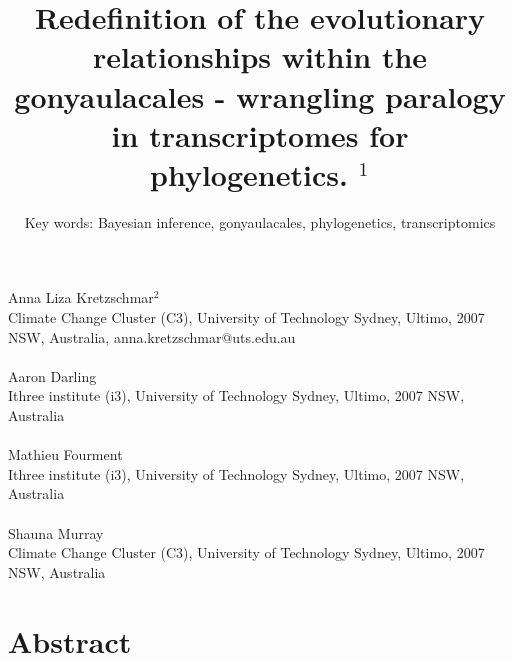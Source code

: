 \documentclass[12pt]{article}
\title{Redefinition of the evolutionary relationships within the gonyaulacales - wrangling paralogy in transcriptomes for phylogenetics. $^{1}$}
\author{Key words: Bayesian inference, gonyaulacales, phylogenetics, transcriptomics}
\date{}
\begin{document}
\maketitle
\paragraph{}Anna Liza Kretzschmar$^{2}$\\
Climate Change Cluster (C3), University of Technology Sydney, Ultimo, 2007 NSW, Australia, anna.kretzschmar@uts.edu.au
\paragraph{}Aaron Darling \\
Ithree institute (i3), University of Technology Sydney, Ultimo, 2007 NSW, Australia
\paragraph{}Mathieu Fourment \\
Ithree institute (i3), University of Technology Sydney, Ultimo, 2007 NSW, Australia
\paragraph{}Shauna Murray\\ 
Climate Change Cluster (C3), University of Technology Sydney, Ultimo, 2007 NSW, Australia
\newpage
\section{Abstract}
\newpage
\end{document}
